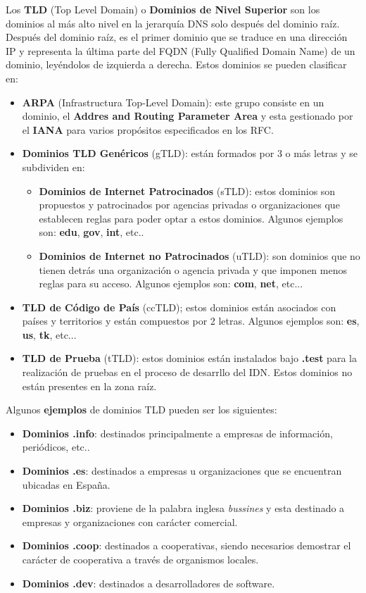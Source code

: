     Los \textbf{TLD} (Top Level Domain) o \textbf{Dominios de Nivel Superior} son los dominios al más alto nivel en la jerarquía DNS solo
    después del dominio raíz. Después del dominio raíz, es el primer dominio que se traduce en una dirección IP y representa la última parte del FQDN (Fully Qualified Domain Name) de un dominio, leyéndolos de izquierda a derecha. Estos dominios se pueden clasificar en:
    \begin{itemize}
        \item \textbf{ARPA} (Infrastructura Top-Level Domain): este grupo consiste en un dominio, el \textbf{Addres and Routing Parameter Area} y esta gestionado por el \textbf{IANA} para varios propósitos especificados en los RFC.
        \item \textbf{Dominios TLD Genéricos} (gTLD): están formados por 3 o más letras y se subdividen en:
        \begin{itemize}
            \item \textbf{Dominios de Internet Patrocinados} (sTLD): estos dominios son propuestos y patrocinados por agencias privadas o organizaciones que establecen reglas para poder optar a estos dominios. Algunos ejemplos son: \textbf{edu}, \textbf{gov}, \textbf{int}, etc..
            \item \textbf{Dominios de Internet no Patrocinados} (uTLD): son dominios que no tienen detrás una organización o agencia privada y que imponen menos reglas para su acceso. Algunos ejemplos son: \textbf{com}, \textbf{net}, etc...
        \end{itemize}

        \item \textbf{TLD de Código de País} (ccTLD); estos dominios están asociados con países y territorios y están compuestos por 2 letras.
        Algunos ejemplos son: \textbf{es}, \textbf{us}, \textbf{tk}, etc...
        \item \textbf{TLD de Prueba} (tTLD): estos dominios están instalados bajo \textbf{.test} para la realización de pruebas en el proceso de desarrllo del IDN. Estos dominios no están presentes en la zona raíz.
    \end{itemize}

    Algunos \textbf{ejemplos} de dominios TLD pueden ser los siguientes:

    \begin{itemize}
        \item \textbf{Dominios .info}: destinados principalmente a empresas de información, periódicos, etc..
        \item \textbf{Dominios .es}: destinados a empresas u organizaciones que se encuentran ubicadas en España.
        \item \textbf{Dominios .biz}: proviene de la palabra inglesa \textit{bussines} y esta destinado a empresas y organizaciones con carácter comercial.
        \item \textbf{Dominios .coop}: destinados a cooperativas, siendo necesarios demostrar el carácter de cooperativa a través de organismos locales.
        \item \textbf{Dominios .dev}: destinados a desarrolladores de software.
    \end{itemize}

